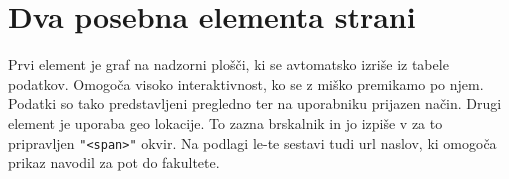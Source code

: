 \documentclass[a4paper,11pt]{article}
\begin{document}
\section{Dva posebna elementa strani}
Prvi element je graf na nadzorni plošči, ki se avtomatsko izriše iz tabele podatkov. Omogoča visoko interaktivnost, ko se z miško premikamo po njem. Podatki so tako predstavljeni pregledno ter na uporabniku prijazen način.\newline
Drugi element je uporaba geo lokacije. To zazna brskalnik in jo izpiše v za to pripravljen \texttt{"<span>"} okvir. Na podlagi le-te sestavi tudi url naslov, ki omogoča prikaz navodil za pot do fakultete.
\end{document}
